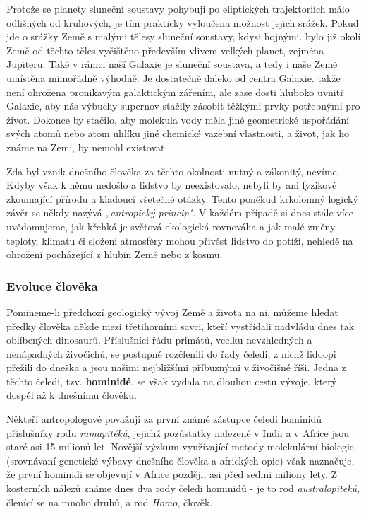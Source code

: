       Protože se planety sluneční soustavy pohybuji po eliptických trajektoriích málo odlišných od
      kruhových, je tím prakticky vyloučena možnost jejich srážek. Pokud jde o srážky Země s malými
      tělesy sluneční soustavy, kdysi hojnými. bylo již okolí Země od těchto těles vyčištěno
      především vlivem velkých planet, zejména Jupiteru. Také v rámci naší Galaxie je sluneční
      soustava, a tedy i naše Země umístěna mimořádně výhodně. Je dostatečně daleko od centra
      Galaxie. takže není ohrožena pronikavým galaktickým zářením, ale zase dosti hluboko uvnitř
      Galaxie, aby nás výbuchy supernov stačily zásobit těžkými prvky potřebnými pro život. Dokonce
      by stačilo, aby molekula vody měla jiné geometrické uspořádání svých atomů nebo atom uhlíku
      jiné chemické vazební vlastnosti, a život, jak ho známe na Zemi, by nemohl existovat.

      Zda byl vznik dnešního člověka za těchto okolnosti nutný a zákonitý, nevíme. Kdyby však k němu
      nedošlo a lidstvo by neexistovalo, nebyli by ani fyzikové zkoumající přírodu a kladoucí
      všetečné otázky. Tento poněkud krkolomný logický závěr se někdy nazývá \emph{„antropický
      princip"}. V každém případě si dnes stále více uvědomujeme, jak křehká je světová ekologická
      rovnováha a jak malé změny teploty, klimatu či složeni atmosféry mohou přivést lidstvo do
      potíží, nehledě na ohrožení pocházející z hlubin Země nebo z kosmu.

      \subsubsection{Evoluce člověka}
        Pomineme-li předchozí geologický vývoj Země a života na ni, můžeme hledat předky člověka
        někde mezi třetihorními savci, kteří vystřídali nadvládu dnes tak oblíbených dinosaurů.
        Příslušníci řádu primátů, vcelku nevzhledných a nenápadných živočichů, se postupně
        rozčlenili do řady čeledi, z nichž lidoopi přežili do dneška a jsou našimi nejbližšími
        příbuznými v živočišné říši. Jedna z těchto čeledi, tzv. \textbf{hominidé}, se však vydala
        na dlouhou cestu vývoje, který dospěl až k dnešnímu člověku.

        Někteří antropologové považuji za první známé zástupce čeledi hominidů příslušníky rodu
        \emph{ramapitéků}, jejichž pozůstatky nalezené v Indii a v Africe jsou staré asi 15 milionů
        let. Novější výzkum využívající metody molekulární biologie (srovnávaní genetické výbavy
        dnešního člověka a afrických opic) však naznačuje, že první hominidi se objevují v Africe
        později, asi před sedmi miliony lety. Z kosterních nálezů známe dnes dva rody čeledi
        hominidů - je to rod \emph{australopiteků}, členící se na mnoho druhů, a rod \emph{Homo},
        člověk.


